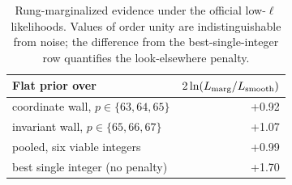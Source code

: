 \begin{table}[htbp]\centering\small
\setlength{\tabcolsep}{4pt}
\begin{tabular}{l r}
\hline
Flat prior over & $2\ln(L_{\rm marg}/L_{\rm smooth})$ \\
\hline
coordinate wall, $p\in\{63,64,65\}$ & +0.92 \\
invariant wall, $p\in\{65,66,67\}$ & +1.07 \\
pooled, six viable integers & +0.99 \\
best single integer (no penalty) & +1.70 \\
\hline
\end{tabular}
\caption{Rung-marginalized evidence under the official low-$\ell$ likelihoods. Values of order unity are indistinguishable from noise; the difference from the best-single-integer row quantifies the look-elsewhere penalty.}
\label{tab:evidence}
\end{table}
